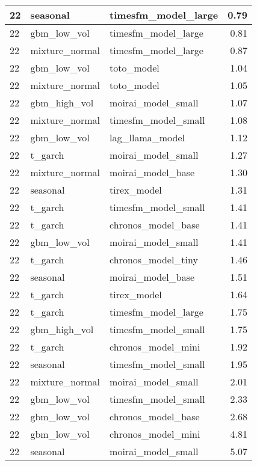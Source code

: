 {\begin{tabular}{lllr}
\midrule
22 & seasonal & timesfm\_model\_large & 0.79 \\
\midrule
22 & gbm\_low\_vol & timesfm\_model\_large & 0.81 \\
\midrule
22 & mixture\_normal & timesfm\_model\_large & 0.87 \\
\midrule
22 & gbm\_low\_vol & toto\_model & 1.04 \\
\midrule
22 & mixture\_normal & toto\_model & 1.05 \\
\midrule
22 & gbm\_high\_vol & moirai\_model\_small & 1.07 \\
\midrule
22 & mixture\_normal & timesfm\_model\_small & 1.08 \\
\midrule
22 & gbm\_low\_vol & lag\_llama\_model & 1.12 \\
\midrule
22 & t\_garch & moirai\_model\_small & 1.27 \\
\midrule
22 & mixture\_normal & moirai\_model\_base & 1.30 \\
\midrule
22 & seasonal & tirex\_model & 1.31 \\
\midrule
22 & t\_garch & timesfm\_model\_small & 1.41 \\
\midrule
22 & t\_garch & chronos\_model\_base & 1.41 \\
\midrule
22 & gbm\_low\_vol & moirai\_model\_small & 1.41 \\
\midrule
22 & t\_garch & chronos\_model\_tiny & 1.46 \\
\midrule
22 & seasonal & moirai\_model\_base & 1.51 \\
\midrule
22 & t\_garch & tirex\_model & 1.64 \\
\midrule
22 & t\_garch & timesfm\_model\_large & 1.75 \\
\midrule
22 & gbm\_high\_vol & timesfm\_model\_small & 1.75 \\
\midrule
22 & t\_garch & chronos\_model\_mini & 1.92 \\
\midrule
22 & seasonal & timesfm\_model\_small & 1.95 \\
\midrule
22 & mixture\_normal & moirai\_model\_small & 2.01 \\
\midrule
22 & gbm\_low\_vol & timesfm\_model\_small & 2.33 \\
\midrule
22 & gbm\_low\_vol & chronos\_model\_base & 2.68 \\
\midrule
22 & gbm\_low\_vol & chronos\_model\_mini & 4.81 \\
\midrule
22 & seasonal & moirai\_model\_small & 5.07 \\
\bottomrule
\end{tabular}
}